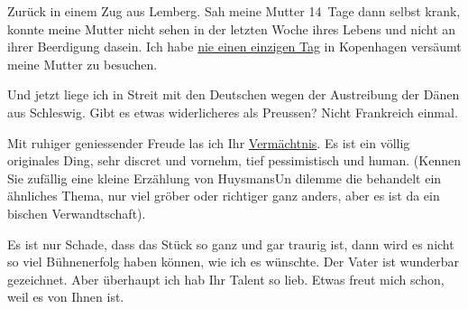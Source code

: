 \pstart
           Zurück in einem Zug aus Lemberg. Sah meine Mutter 14 Tage dann selbst
               krank, konnte meine Mutter
               nicht sehen in der letzten Woche ihres Lebens und nicht an ihrer Beerdigung dasein.
               Ich habe \uline{nie einen einzigen Tag} in Kopenhagen versäumt meine Mutter zu besuchen.\pend
           
\pstart
           Und jetzt liege ich in Streit mit den Deutschen
               wegen der Austreibung der Dänen aus Schleswig. Gibt es etwas widerlicheres als {\pb}Preussen? Nicht Frankreich einmal.\pend
           
\pstart
           Mit ruhiger geniessender Freude las ich Ihr \uline{Vermächtnis}. Es ist ein völlig originales Ding, sehr discret und vornehm, tief
               pessimistisch und human. (Kennen Sie zufällig eine kleine Erzählung von HuysmansUn
                  dilemme die behandelt ein ähnliches Thema, nur viel gröber oder richtiger
               ganz anders, aber es ist da ein bischen Verwandtschaft).\pend
           
\pstart
           Es ist nur Schade, dass das Stück so ganz und gar traurig ist, dann wird es nicht so viel Bühnenerfolg
               haben können, {\pb}wie ich es
               wünschte. Der Vater ist wunderbar gezeichnet. Aber überhaupt ich hab Ihr Talent so
               lieb. Etwas freut mich schon, weil es von Ihnen ist.\pend
           
